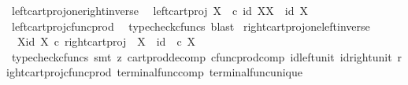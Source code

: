 \begin{isabellebody}
\endisatagproof
{\isafoldproof}%
%
\isadelimproof
\isanewline
%
\endisadelimproof
\isanewline
{}\isamarkupfalse%
\ left{\isacharunderscore}{\kern0pt}cart{\isacharunderscore}{\kern0pt}proj{\isacharunderscore}{\kern0pt}one{\isacharunderscore}{\kern0pt}right{\isacharunderscore}{\kern0pt}inverse{\isacharcolon}{\kern0pt}\isanewline
\ \ {\isachardoublequoteopen}left{\isacharunderscore}{\kern0pt}cart{\isacharunderscore}{\kern0pt}proj\ X\ {\isasymone}\ {\isasymcirc}\isactrlsub c\ {\isasymlangle}id\ X{\isacharcomma}{\kern0pt}{\isasymbeta}\isactrlbsub X\isactrlesub {\isasymrangle}\ {\isacharequal}{\kern0pt}\ id\ X{\isachardoublequoteclose}\isanewline
%
\isadelimproof
\ \ %
\endisadelimproof
%
\isatagproof
{}\isamarkupfalse%
\ left{\isacharunderscore}{\kern0pt}cart{\isacharunderscore}{\kern0pt}proj{\isacharunderscore}{\kern0pt}cfunc{\isacharunderscore}{\kern0pt}prod\ \isamarkupfalse%
\ {\isacharparenleft}{\kern0pt}typecheck{\isacharunderscore}{\kern0pt}cfuncs{\isacharcomma}{\kern0pt}\ blast{\isacharparenright}{\kern0pt}%
\endisatagproof
{\isafoldproof}%
%
\isadelimproof
\isanewline
%
\endisadelimproof
\isanewline
{}\isamarkupfalse%
\ right{\isacharunderscore}{\kern0pt}cart{\isacharunderscore}{\kern0pt}proj{\isacharunderscore}{\kern0pt}one{\isacharunderscore}{\kern0pt}left{\isacharunderscore}{\kern0pt}inverse{\isacharcolon}{\kern0pt}\isanewline
\ \ {\isachardoublequoteopen}{\isasymlangle}{\isasymbeta}\isactrlbsub X\isactrlesub {\isacharcomma}{\kern0pt}id\ X{\isasymrangle}\ {\isasymcirc}\isactrlsub c\ right{\isacharunderscore}{\kern0pt}cart{\isacharunderscore}{\kern0pt}proj\ {\isasymone}\ X\ {\isacharequal}{\kern0pt}\ id\ {\isacharparenleft}{\kern0pt}{\isasymone}\ {\isasymtimes}\isactrlsub c\ X{\isacharparenright}{\kern0pt}{\isachardoublequoteclose}\isanewline
%
\isadelimproof
\ \ %
\endisadelimproof
%
\isatagproof
{}\isamarkupfalse%
\ {\isacharparenleft}{\kern0pt}typecheck{\isacharunderscore}{\kern0pt}cfuncs{\isacharcomma}{\kern0pt}\ smt\ {\isacharparenleft}{\kern0pt}z{}{\isacharparenright}{\kern0pt}\ cart{\isacharunderscore}{\kern0pt}prod{\isacharunderscore}{\kern0pt}decomp\ cfunc{\isacharunderscore}{\kern0pt}prod{\isacharunderscore}{\kern0pt}comp\ id{\isacharunderscore}{\kern0pt}left{\isacharunderscore}{\kern0pt}unit{}\ id{\isacharunderscore}{\kern0pt}right{\isacharunderscore}{\kern0pt}unit{}\ right{\isacharunderscore}{\kern0pt}cart{\isacharunderscore}{\kern0pt}proj{\isacharunderscore}{\kern0pt}cfunc{\isacharunderscore}{\kern0pt}prod\ terminal{\isacharunderscore}{\kern0pt}func{\isacharunderscore}{\kern0pt}comp\ terminal{\isacharunderscore}{\kern0pt}func{\isacharunderscore}{\kern0pt}unique{\isacharparenright}{\kern0pt}%

\end{isabellebody}
